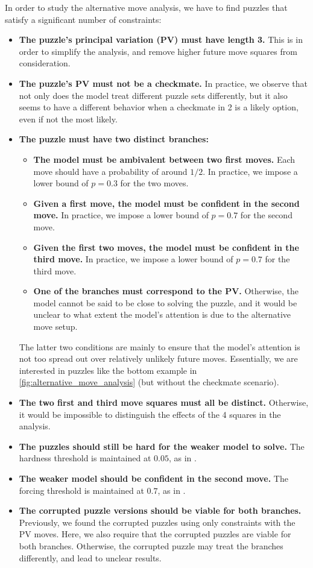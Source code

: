 \documentclass{article}
\begin{document}
In order to study the alternative move analysis, we have to find puzzles that satisfy a significant number of constraints:
\begin{itemize}
  \item \textbf{The puzzle's principal variation (PV) must have length 3.} This is in order to simplify the analysis, and remove higher future move squares from consideration.
  \item \textbf{The puzzle's PV must not be a checkmate.} In practice, we observe that not only does the model treat different puzzle sets differently, but it also seems to have a different behavior when a checkmate in 2 is a likely option, even if not the most likely.
  \item \textbf{The puzzle must have two distinct branches:}
  \begin{itemize}
    \item \textbf{The model must be ambivalent between two first moves.} Each move should have a probability of around $1/2$. In practice, we impose a lower bound of $p=0.3$ for the two moves.
    \item \textbf{Given a first move, the model must be confident in the second move.} In practice, we impose a lower bound of $p=0.7$ for the second move.
    \item \textbf{Given the first two moves, the model must be confident in the third move.} In practice, we impose a lower bound of $p=0.7$ for the third move.
    \item \textbf{One of the branches must correspond to the PV.} Otherwise, the model cannot be said to be close to solving the puzzle, and it would be unclear to what extent the model's attention is due to the alternative move setup.
  \end{itemize}
  The latter two conditions are mainly to ensure that the model's attention is not too spread out over relatively unlikely future moves. Essentially, we are interested in puzzles like the bottom example in \cref{fig:alternative_move_analysis} (but without the checkmate scenario).
  \item \textbf{The two first and third move squares must all be distinct.} Otherwise, it would be impossible to distinguish the effects of the 4 squares in the analysis.
  \item \textbf{The puzzles should still be hard for the weaker model to solve.} The hardness threshold is maintained at $0.05$, as in \citet{jenner2024evidence}.
  \item \textbf{The weaker model should be confident in the second move.} The forcing threshold is maintained at $0.7$, as in \citet{jenner2024evidence}.
  \item \textbf{The corrupted puzzle versions should be viable for both branches.} Previously, we found the corrupted puzzles using only constraints with the PV moves. Here, we also require that the corrupted puzzles are viable for both branches. Otherwise, the corrupted puzzle may treat the branches differently, and lead to unclear results.
\end{itemize}
\end{document}
